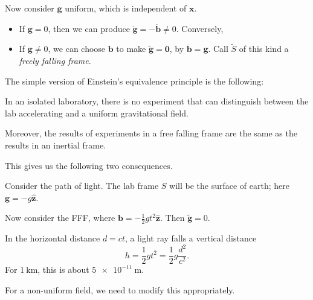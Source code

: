 \documentclass[12pt]{article}
\begin{document}
Now consider $\mathbf{g}$ uniform, which is independent of $\mathbf{x}$.
\begin{itemize}
	\item If $\mathbf{g} = 0$, then we can produce $\mathbf{\ddot g} = - \mathbf{\ddot b} \neq 0$. Conversely,
	\item If $\mathbf{g} \neq 0$, we can choose $\mathbf{b}$ to make $\mathbf{\tilde g} = \mathbf{0}$, by $\mathbf{\ddot b} = \mathbf{g}$. Call $\tilde S$ of this kind a \emph{freely falling frame}.
\end{itemize}


The simple version of Einstein's equivalence principle is the following:
\begin{center}
	In an isolated laboratory, there is no experiment that can distinguish between the lab accelerating and a uniform gravitational field.

	Moreover, the results of experiments in a free falling frame are the same as the results in an inertial frame.
\end{center}

This gives us the following two consequences.

\begin{exbox}
Consider the path of light. The lab frame $S$ will be the surface of earth; here $\mathbf{g} = -g\mathbf{\hat z}$.

Now consider the FFF, where $\mathbf{b} = -\frac{1}{2} g t^2 \mathbf{\hat z}$. Then $\mathbf{\tilde g} = 0$.

In the horizontal distance $d = ct$, a light ray falls a vertical distance
\[
h = \frac{1}{2} g t^2 = \frac{1}{2} g \frac{d^2}{c^2}.
\]
For $\qty{1}{\kilo\metre}$, this is about $\qty{5e-11}{\metre}$.

For a non-uniform field, we need to modify this appropriately.
\end{exbox}
\end{document}
